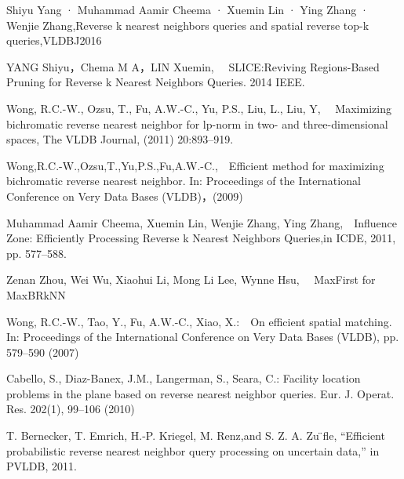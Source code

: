 \begin{thebibliography}{99}
\addtolength{\itemsep}{-0.8 em} %

  Shiyu Yang · Muhammad Aamir Cheema · Xuemin Lin · Ying Zhang · Wenjie Zhang,Reverse k nearest neighbors queries and spatial reverse top-k queries,VLDBJ2016

    YANG Shiyu，Chema M A，LIN Xuemin, ~~SLICE:Reviving Regions-Based Pruning for Reverse k Nearest Neighbors Queries. 2014 IEEE.

     Wong, R.C.-W., Ozsu, T., Fu, A.W.-C., Yu, P.S., Liu, L., Liu, Y, ~~Maximizing bichromatic reverse nearest neighbor for lp-norm in two- and three-dimensional spaces, The VLDB Journal, (2011) 20:893–919.

    Wong,R.C.-W.,Ozsu,T.,Yu,P.S.,Fu,A.W.-C.,~~Efficient method for maximizing bichromatic reverse nearest neighbor. In: Proceedings of the International Conference on Very Data Bases (VLDB)，(2009)

   Muhammad Aamir Cheema, Xuemin Lin, Wenjie Zhang, Ying Zhang,~~Influence Zone: Efficiently Processing Reverse k Nearest Neighbors Queries,in ICDE, 2011, pp. 577–588.

   Zenan Zhou, Wei Wu, Xiaohui Li, Mong Li Lee, Wynne Hsu, ~~MaxFirst for MaxBRkNN

  Wong, R.C.-W., Tao, Y., Fu, A.W.-C., Xiao, X.:~~On efficient spatial matching. In: Proceedings of the International Conference on Very Data Bases (VLDB), pp. 579–590 (2007)

   Cabello, S., Diaz-Banex, J.M., Langerman, S., Seara, C.: Facility location problems in the plane based on reverse nearest neighbor queries. Eur. J. Operat. Res. 202(1), 99–106 (2010)

  T. Bernecker, T. Emrich, H.-P. Kriegel, M. Renz,and S. Z. A. Zu ̈fle, “Efficient probabilistic reverse nearest neighbor query processing on uncertain data,” in PVLDB, 2011.

  
\end{thebibliography}